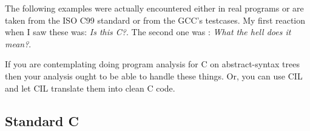 \documentclass[letterpaper]{article}
\begin{document}
 The following examples were actually encountered either in real programs or
are taken from the ISO C99 standard or from the GCC's testcases. My first
reaction when I saw these was: {\em Is this C?}. The second one was : {\em
What the hell does it mean?}. 

 If you are contemplating doing program analysis for C on abstract-syntax
trees then your analysis ought to be able to handle these things. Or, you can
use CIL and let CIL translate them into clean C code. 

%
%
%
 \subsection{Standard C}
\end{document}
